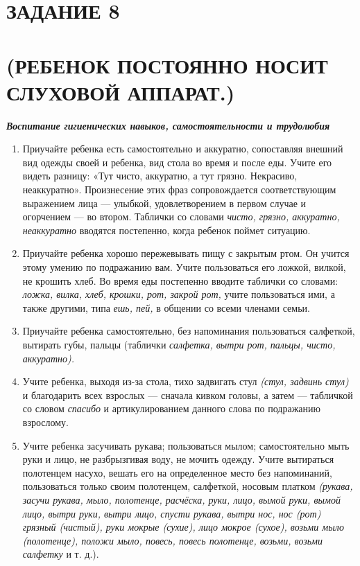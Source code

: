 \documentclass[a5paper]{book}
\renewcommand{\emph}[1]{\textit{#1}}
\begin{document}
\section{ЗАДАНИЕ 8}\section*{(РЕБЕНОК ПОСТОЯННО НОСИТ СЛУХОВОЙ АППАРАТ.)}

\emph{\textbf{Воспитание гигиенических навыков, самостоятельности и
трудолюбия}}


\begin{enumerate}
\def\labelenumi{\arabic{enumi}.}
\item
  
  Приучайте ребенка есть самостоятельно и аккуратно, сопоставляя внешний
  вид одежды своей и ребенка, вид стола во время и после еды. Учите его
  видеть разницу: «Тут чисто, аккуратно, а тут грязно. Некрасиво,
  неаккуратно». Произнесение этих фраз сопровождается соответствующим
  выражением лица --- улыбкой, удовлетворением в первом случае и
  огорчением --- во втором. Таблички со словами \emph{чисто, грязно,
  аккуратно, неаккуратно} вводятся постепенно, когда ребенок поймет
  ситуацию.
  
\item
  
  Приучайте ребенка хорошо пережевывать пищу с закрытым ртом. Он учится
  этому умению по подражанию вам. Учите пользоваться его ложкой, вилкой,
  не крошить хлеб. Во время еды постепенно вводите таблички со словами:
  \emph{ложка, вилка, хлеб, крошки, рот, закрой рот,} учите пользоваться
  ими, а также другими, типа \emph{ешь, пей,} в общении со всеми членами
  семьи.
  
\item
  
  Приучайте ребенка самостоятельно, без напоминания пользоваться
  салфеткой, вытирать губы, пальцы (таблички \emph{салфетка, вытри рот,
  пальцы, чисто, аккуратно).}
  
\item
  
  Учите ребенка, выходя из-за стола, тихо задвигать стул \emph{(стул,
  задвинь стул)} и благодарить всех взрослых --- сначала кивком головы,
  а затем --- табличкой со словом \emph{спасибо} и артикулированием
  данного слова по подражанию взрослому.
  
\item
  
  Учите ребенка засучивать рукава; пользоваться мылом; самостоятельно
  мыть руки и лицо, не разбрызгивая воду, не мочить одежду. Учите
  вытираться полотенцем насухо, вешать его на определенное место без
  напоминаний, пользоваться только своим полотенцем, салфеткой, носовым
  платком \emph{(рукава, засучи рукава, мыло, полотенце, расчёска, руки,
  лицо, вымой руки, вымой лицо, вытри руки, вытри лицо, спусти рукава,
  вытри нос, нос (рот) грязный (чистый), руки мокрые (сухие), лицо
  мокрое (сухое), возьми мыло (полотенце), положи мыло, повесь, повесь
  полотенце, возьми, возьми салфетку} и т. д.).
  
\end{enumerate}
\end{document}
